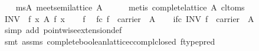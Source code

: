 \begin{isabellebody}
\ \ \isamarkupfalse%
\ ms{}A{}\ {}meet{}semilattice\ A{}\isanewline
\ \ \ \ \isamarkupfalse%
\ {}metis\ {}complete{}lattice\ A{}\ cl{}to{}ms{}\isanewline
\isanewline
\ \ \isamarkupfalse%
\ {}INV\ {}\ {}{}{}f\ x{}\ {}\isactrlbsub A\isactrlesub \ {}f\ x{}{}{}\isanewline
\isanewline
\ \ \isamarkupfalse%
\ f\ \isamarkupfalse%
\ fc{}\ {}f\ {}\ carrier\ {}{}\ A{}{}\isanewline
\isanewline
\ \ \isamarkupfalse%
\ ifc{}\ {}{}INV\ f\ {}\ carrier\ {}{}\ A{}{}\isanewline
\ \ \ \ \isamarkupfalse%
\ {}simp\ add{}\ pointwise{}extension{}def{}\isanewline
\ \ \ \ \isamarkupfalse%
\ {}smt\ assms\ complete{}boolean{}lattice{}ccompl{}closed\ ftype{}pred{}\isanewline
\isanewline

\end{isabellebody}
